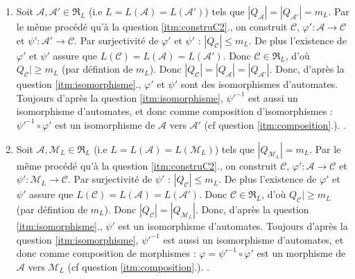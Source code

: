 \documentclass{article}
\begin{document}
\begin{enumerate}
    \item Soit $\mathcal{A}, \mathcal{A'} \in \mathfrak{R}_L$  (i.e $L = L(\mathcal{A}) = L(\mathcal{A'})$) tels que $|Q_\mathcal{A}| = |Q_\mathcal{A'}| = m_L$. \newline
    Par le même procédé qu'à la question \ref{itm:construC2}., on construit $\mathcal{C}$, $\varphi' : \mathcal{A} \to \mathcal{C}$ et $\psi' : \mathcal{A'} \to \mathcal{C}$. \newline
    Par surjectivité de $\varphi'$ et $\psi'$ : $|Q_\mathcal{C}| \leq m_L$. De plus l'existence de $\varphi'$ et $\psi'$ assure que $L(\mathcal{C}) = L(\mathcal{A}) = L(\mathcal{A'})$. Donc $\mathcal{C} \in \mathfrak{R}_L$, d'où $Q_\mathcal{C}| \geq m_L$ (par défintion de $m_L$). Donc $|Q_\mathcal{C}| = |Q_\mathcal{A}| = |Q_\mathcal{A'}|$. \newline
    Donc, d'après la question \ref{itm:isomorphisme}., $\varphi'$ et $\psi'$ sont des isomorphismes d'automates. \newline
    Toujours d'après la question \ref{itm:isomorphisme}, $\psi'^{-1}$ est aussi un isomorphisme d'automates, et donc comme composition d'isomorphismes : $\psi'^{-1} \circ \varphi'$ est un isomorphisme de $\mathcal{A}$ vers $\mathcal{A'}$ (cf question \ref{itm:composition}.). \newline
    .

    \item Soit $\mathcal{A}, \mathcal{M}_L \in \mathfrak{R}_L$  (i.e $L = L(\mathcal{A}) = L(\mathcal{M}_L)$) tels que $|Q_{\mathcal{M}_L}| = m_L$. \newline
    Par le même procédé qu'à la question \ref{itm:construC2}., on construit $\mathcal{C}$, $\varphi' : \mathcal{A} \to \mathcal{C}$ et $\psi' : \mathcal{M}_L \to \mathcal{C}$. \newline
    Par surjectivité de $\psi'$ : $|Q_\mathcal{C}| \leq m_L$. De plus l'existence de $\varphi'$ et $\psi'$ assure que $L(\mathcal{C}) = L(\mathcal{A}) = L(\mathcal{A'})$. Donc $\mathcal{C} \in \mathfrak{R}_L$, d'où $Q_\mathcal{C}| \geq m_L$ (par défintion de $m_L$). Donc $|Q_\mathcal{C}| = |Q_{\mathcal{M}_L}|$. \newline
    Donc, d'après la question \ref{itm:isomorphisme}., $\psi'$ est un isomorphisme d'automates. \newline
    Toujours d'après la question \ref{itm:isomorphisme}, $\psi'^{-1}$ est aussi un isomorphisme d'automates, et donc comme composition de morphismes : $\varphi = \psi'^{-1} \circ \varphi'$ est un morphisme de $\mathcal{A}$ vers $\mathcal{M}_L$ (cf question \ref{itm:composition}.). \newline
    .
\end{enumerate}
\end{document}
